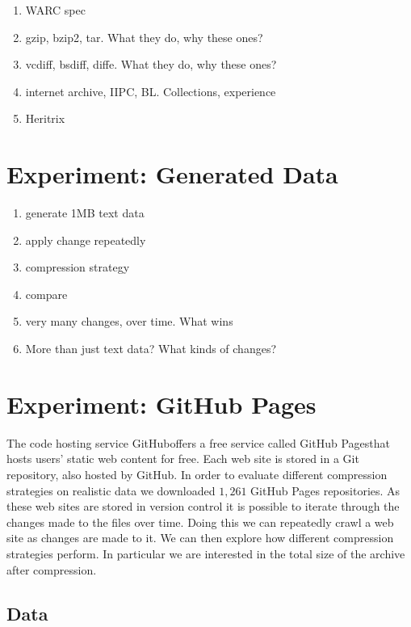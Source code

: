 \documentclass[11pt, twocolumn]{article}
\def \domainscrawled {1,261}
\begin{document}
  \begin{enumerate}
  \item WARC spec
  \item gzip, bzip2, tar. What they do, why these ones?
  \item vcdiff, bsdiff, diffe. What they do, why these ones?
  \item internet archive, IIPC, BL. Collections, experience
  \item Heritrix
  \end{enumerate}

\section{Experiment: Generated Data}

  \begin{enumerate}
  \item generate 1MB text data
  \item apply change repeatedly
  \item compression strategy
  \item compare
  \item very many changes, over time. What wins
  \item More than just text data? What kinds of changes?
  \end{enumerate}

\section{Experiment: GitHub Pages}\label{section:exp:github}

  The code hosting service GitHub\footnotemark offers a free service called GitHub Pages\footnotemark that hosts users' static web content for free. Each web site is stored in a Git repository, also hosted by GitHub. In order to evaluate different compression strategies on realistic data we downloaded $\domainscrawled$ GitHub Pages repositories. As these web sites are stored in version control it is possible to iterate through the changes made to the files over time. Doing this we can repeatedly crawl a web site as changes are made to it. We can then explore how different compression strategies perform. In particular we are interested in the total size of the archive after compression.

  \subsection{Data}
\end{document}
